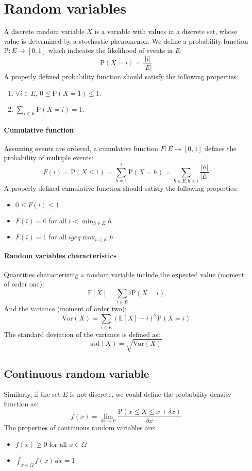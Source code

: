 \section{Random variables}

A discrete random variable $X$ is a variable with values in a discrete set, whose value is determined by a stochastic phenomenon.
We define a probability function $\text{P}:E\rightarrow[0,1]$ which indicates the likelihood of events in $E$: 
\[\text{P}(X=i)=\dfrac{\left\lvert i \right\rvert}{\left\lvert E \right\rvert}\]
A properly defined probability function should satisfy the following properties:
\begin{enumerate}
    \item $\forall i \in E$, $0 \leq \text{P}(X=1) \leq 1$. 
    \item $\sum_{i \in E}\text{P}(X=i)=1$. 
\end{enumerate}

\paragraph*{Cumulative function}
Assuming events are ordered, a cumulative function $F:E\rightarrow[0,1]$ defines the probability of multiple events:
\[F(i)=\text{P}(X\leq 1)=\sum_{h=1}^{i}\text{P}(X=h)=\sum_{h \in E, h \leq i} \dfrac{\left\lvert h \right\rvert}{\left\lvert E \right\rvert}\]
A properly defined cumulative function should satisfy the following properties:
\begin{itemize}
    \item $0 \leq F(i) \leq 1$ 
    \item $F(i)=0$ for all $i < \min_{h \in E}h$
    \item $F(i)=1$ for all $i geq \max_{h \in E}h$
\end{itemize}

\paragraph*{Random variables characteristics}
Quantities characterizing a random variable include the expected value (moment of order one):
\[\mathbb{E}\left[X\right]=\sum_{i \in E}i\text{P}(X=i)\]
And the variance (moment of order two):
\[\text{Var}(X)=\sum_{i \in E}{\left(\mathbb{E}\left[X\right]-i\right)}^2\text{P}(X=i)\]
The standard deviation of the variance is defined as:
\[\text{std}(X)=\sqrt{\text{Var}(X)}\]

\subsection{Continuous random variable}
Similarly, if the set $E$ is not discrete, we could define the probability density function as:
\[f(x)=\lim_{\delta x \rightarrow 0}\dfrac{\text{P}(x\leq X\leq x+\delta x)}{\delta x}\]
The properties of continuous random variables are:
\begin{itemize}
    \item $f(x) \geq 0$ for all $ x \in \Omega$
    \item $\int_{x \in \Omega}f(x)\,dx=1$
\end{itemize}

